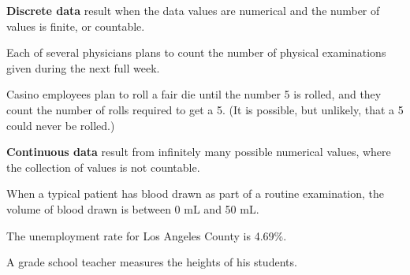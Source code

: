 \documentclass{beamer}
\begin{document}
\begin{frame}
\begin{definition}
\textbf{Discrete data} result when the data values are numerical and the number of values is finite, or countable.
\end{definition}\pause

\begin{example}
Each of several physicians plans to count the number of physical examinations given during the next full week.
\end{example}\pause

\begin{example}
Casino employees plan to roll a fair die until the number 5 is rolled, and they count the number of rolls required to get a 5. (It is possible, but unlikely, that a 5 could never be rolled.)
\end{example}
\end{frame}

\begin{frame}
\begin{definition}
\textbf{Continuous data} result from infinitely many possible numerical values, where the collection of values is not countable.
\end{definition}\pause

\begin{example}
When a typical patient has blood drawn as part of a routine examination, the volume of blood drawn is between 0 mL and 50 mL.
\end{example}\pause

\begin{example}
The unemployment rate for Los Angeles County is 4.69\%.
\end{example}\pause

\begin{example}
A grade school teacher measures the heights of his students.
\end{example}
\end{frame}
\end{document}
